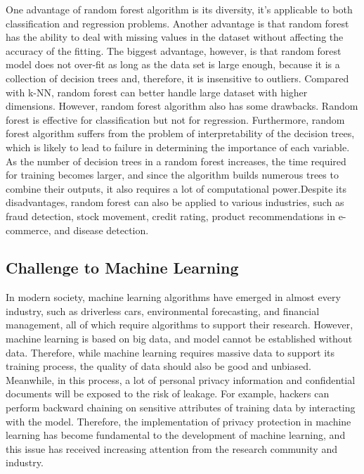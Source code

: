 \documentclass[12pt]{article} %
\theoremstyle{definition}
\begin{document}
One advantage of random forest algorithm is its diversity, it's applicable to both classification and regression problems. Another advantage is that random forest has the ability to deal with missing values in the dataset without affecting the accuracy of the fitting. The biggest advantage, however, is that random forest model does not over-fit as long as the data set is large enough, because it is a collection of decision trees and, therefore, it is insensitive to outliers.
Compared with k-NN, random forest can better handle large dataset with  higher dimensions. However, random forest algorithm also has some drawbacks. Random forest is effective for classification but not for regression. Furthermore, random forest algorithm suffers from the problem of interpretability of the decision trees, which is likely to lead to failure in determining the importance of each variable. As the number of decision trees in a random forest increases, the time required for training becomes larger, and since the algorithm builds numerous trees to combine their outputs, it also requires a lot of computational power.\cite{RF2}Despite its disadvantages, random forest can also be applied to various industries, such as fraud detection, stock movement, credit rating, product recommendations in e-commerce, and disease detection.\cite{RF1}


\subsection{Challenge to Machine Learning}
In modern society, machine learning algorithms have emerged in almost every industry, such as driverless cars, environmental forecasting, and financial management, all of which require algorithms to support their research. However, machine learning is based on big data, and model cannot be established without data. Therefore, while machine learning requires massive data to support its training process, the quality of data should also be good and unbiased. Meanwhile, in this process, a lot of personal privacy information and confidential documents will be exposed to the risk of leakage. For example, hackers can perform backward chaining on sensitive attributes of training data by interacting with the model. Therefore, the implementation of privacy protection in machine learning has become fundamental to the development of machine learning, and this issue has received increasing attention from the research community and industry.\newline
\end{document}
